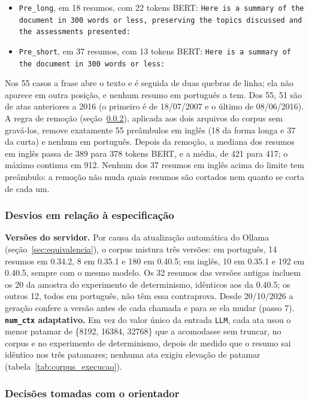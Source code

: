 \documentclass[12pt]{article}
\begin{document}
\begin{itemize}
\item \texttt{Pre\_long}, em 18 resumos, com 22 tokens BERT: \texttt{Here is a
  summary of the document in 300 words or less, preserving the topics discussed
  and the assessments presented:}
\item \texttt{Pre\_short}, em 37 resumos, com 13 tokens BERT: \texttt{Here is a
  summary of the document in 300 words or less:}
\end{itemize}

Nos 55 casos a frase abre o texto e é seguida de duas quebras de linha; ela não
aparece em outra posição, e nenhum resumo em português a tem. Dos 55, 51 são de
atas anteriores a 2016 (o primeiro é de 18/07/2007 e o último de 08/06/2016). A
regra de remoção (seção~\ref{sec:decisoes}), aplicada aos dois arquivos do
corpus sem gravá-los, remove exatamente 55 preâmbulos em inglês (18 da forma
longa e 37 da curta) e nenhum em português. Depois da remoção, a mediana dos
resumos em inglês passa de 389 para 378 tokens BERT, e a média, de 421 para 417;
o máximo continua em 912. Nenhum dos 37 resumos em inglês acima do limite tem
preâmbulo: a remoção não muda quais resumos são cortados nem quanto se corta de
cada um.

\subsubsection{Desvios em relação à especificação}\label{sec:desvios}

\textbf{Versões do servidor.} Por causa da atualização automática do Ollama
(seção~\ref{sec:equivalencia}), o corpus mistura três versões: em português, 14
resumos em 0.34.2, 8 em 0.35.1 e 180 em 0.40.5; em inglês, 10 em 0.35.1 e 192
em 0.40.5, sempre com o mesmo modelo. Os 32 resumos das versões antigas incluem
os 20 da amostra do experimento de determinismo, idênticos aos da 0.40.5; os
outros 12, todos em português, não têm essa contraprova. Desde 20/10/2026 a
geração confere a versão antes de cada chamada e para se ela mudar (passo 7).
\textbf{\texttt{num\_ctx} adaptativo.} Em vez do valor único da entrada
\texttt{LLM}, cada ata usou o menor patamar de \{8192, 16384, 32768\} que a
acomodasse sem truncar, no corpus e no experimento de determinismo, depois de
medido que o resumo sai idêntico nos três patamares; nenhuma ata exigiu
elevação de patamar (tabela~\ref{tab:corpus_execucao}).

\subsubsection{Decisões tomadas com o orientador}\label{sec:decisoes}
\end{document}

